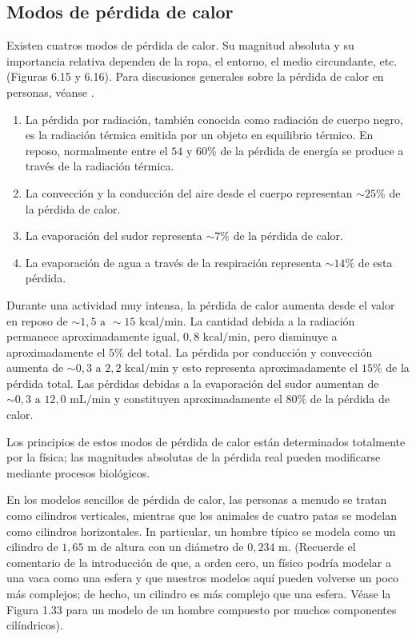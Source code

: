 \documentclass[12pt]{book}
\begin{document}
\subsection{Modos de pérdida de calor}

Existen cuatros modos de pérdida de calor. Su magnitud absoluta y su importancia relativa dependen de la ropa, el entorno, el medio circundante, etc. (Figuras 6.15 y 6.16). Para discusiones generales sobre la pérdida de calor en personas, véanse \cite{10,11,19,35,106}.

\begin{enumerate}
\item La pérdida por radiación, también conocida como radiación de cuerpo negro, es la radiación térmica emitida por un objeto en equilibrio térmico. En reposo, normalmente entre el $54\text{ y }60\%$ de la pérdida de energía se produce a través de la radiación térmica.
\item La convección y la conducción del aire desde el cuerpo representan $\sim 25\%$ de la pérdida de calor.
\item La evaporación del sudor representa $\sim 7\%$ de la pérdida de calor.
\item La evaporación de agua a través de la respiración representa $\sim 14\%$ de esta pérdida.
\end{enumerate}

Durante una actividad muy intensa, la pérdida de calor aumenta desde el valor en reposo de $\sim 1{,}5\text{ a }\sim 15\text{ kcal/min}$. La cantidad debida a la radiación permanece aproximadamente igual, $0{,}8\text{ kcal/min}$, pero disminuye a aproximadamente el $5\%$ del total. La pérdida por conducción y convección aumenta de $\sim 0{,}3\text{ a }2{,}2\text{ kcal/min}$ y esto representa aproximadamente el $15\%$ de la pérdida total. Las pérdidas debidas a la evaporación del sudor aumentan de $\sim 0{,}3\text{ a }12{,}0\text{ mL/min}$ y constituyen aproximadamente el $80\%$ de la pérdida de calor.

Los principios de estos modos de pérdida de calor están determinados totalmente por la física; las magnitudes absolutas de la pérdida real pueden modificarse mediante procesos biológicos.

En los modelos sencillos de pérdida de calor, las personas a menudo se tratan como cilindros verticales, mientras que los animales de cuatro patas se modelan como cilindros horizontales. In particular, un hombre típico se modela como un cilindro de $1{,}65\text{ m}$ de altura con un diámetro de $0{,}234\text{ m}$. (Recuerde el comentario de la introducción de que, a orden cero, un físico podría modelar a una vaca como una esfera y que nuestros modelos aquí pueden volverse un poco más complejos; de hecho, un cilindro es más complejo que una esfera. Véase la Figura 1.33 para un modelo de un hombre compuesto por muchos componentes cilíndricos).
\end{document}
